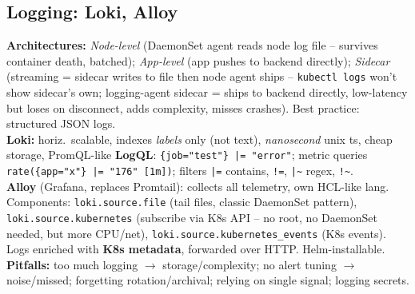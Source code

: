 \subsection{Logging: Loki, Alloy}
\textbf{Architectures:} \textit{Node-level} (DaemonSet agent reads node log file -- survives container death, batched); \textit{App-level} (app pushes to backend directly); \textit{Sidecar} (streaming = sidecar writes to file then node agent ships -- \texttt{kubectl logs} won't show sidecar's own; logging-agent sidecar = ships to backend directly, low-latency but loses on disconnect, adds complexity, misses crashes). Best practice: structured JSON logs. \\
\textbf{Loki:} horiz.\ scalable, indexes \textit{labels} only (not text), \textit{nanosecond} unix ts, cheap storage, PromQL-like \textbf{LogQL}: \texttt{\{job="test"\} |= "error"}; metric queries \texttt{rate(\{app="x"\} |= "176" [1m])}; filters \texttt{|=} contains, \texttt{!=}, \texttt{|\~{}} regex, \texttt{!\~{}}. \\
\textbf{Alloy} (Grafana, replaces Promtail): collects all telemetry, own HCL-like lang. Components: \texttt{loki.source.file} (tail files, classic DaemonSet pattern), \texttt{loki.source.kubernetes} (subscribe via K8s API -- no root, no DaemonSet needed, but more CPU/net), \texttt{loki.source.kubernetes\_events} (K8s events). Logs enriched with \textbf{K8s metadata}, forwarded over HTTP. Helm-installable. \\
\textbf{Pitfalls:} too much logging $\rightarrow$ storage/complexity; no alert tuning $\rightarrow$ noise/missed; forgetting rotation/archival; relying on single signal; logging secrets.
